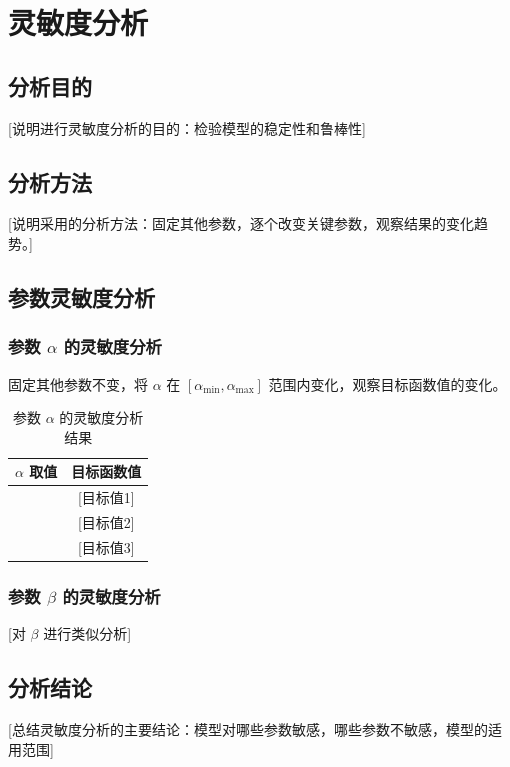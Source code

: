 
\section{灵敏度分析}

\subsection{分析目的}

[说明进行灵敏度分析的目的：检验模型的稳定性和鲁棒性]

\subsection{分析方法}

[说明采用的分析方法：固定其他参数，逐个改变关键参数，观察结果的变化趋势。]

\subsection{参数灵敏度分析}

\subsubsection{参数 $\alpha$ 的灵敏度分析}

固定其他参数不变，将 $\alpha$ 在 $[\alpha_{\min}, \alpha_{\max}]$ 范围内变化，观察目标函数值的变化。

\begin{table}[htbp]
\centering
\caption{参数 $\alpha$ 的灵敏度分析结果}
\label{tab:sens_alpha}
\begin{tabular}{cc}
\toprule
\textbf{$\alpha$ 取值} & \textbf{目标函数值} \\
\midrule
[$\alpha_1$] & [目标值1] \\
[$\alpha_2$] & [目标值2] \\
[$\alpha_3$] & [目标值3] \\
\bottomrule
\end{tabular}
\end{table}


\subsubsection{参数 $\beta$ 的灵敏度分析}

[对 $\beta$ 进行类似分析]

\subsection{分析结论}

[总结灵敏度分析的主要结论：模型对哪些参数敏感，哪些参数不敏感，模型的适用范围]
